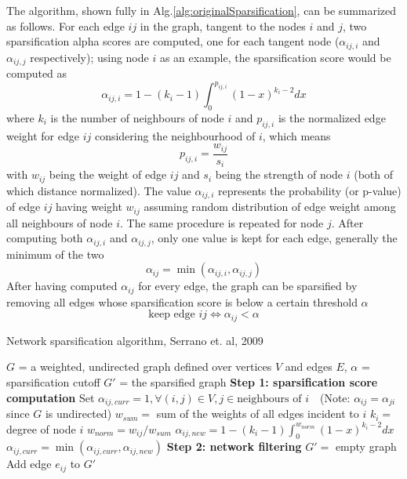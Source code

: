 The algorithm, shown fully in Alg.\ref{alg:originalSparsification}, can be summarized as follows. For each edge $ij$ in the graph, tangent to the nodes $i$ and $j$, two sparsification alpha scores are computed, one for each tangent node ($\alpha_{ij,i}$ and $\alpha_{ij,j}$ respectively); using node $i$ as an example, the sparsification score would be computed as
$$\alpha_{ij,i} = 1 - (k_i-1) \int_0^{p_{ij,i}}(1-x)^{k_i-2}dx$$
where $k_i$ is the number of neighbours of node $i$ and $p_{ij,i}$ is the normalized edge weight for edge $ij$ considering the neighbourhood of $i$, which means 
$$p_{ij,i} = \frac{w_{ij}}{s_i}$$ 
with $w_{ij}$ being the weight of edge $ij$ and $s_i$ being the strength of node $i$ (both of which distance normalized). The value $\alpha_{ij,i}$ represents the probability (or p-value) of edge $ij$ having weight $w_{ij}$ assuming random distribution of edge weight among all neighbours of node $i$.
The same procedure is repeated for node $j$.
After computing both $\alpha_{ij,i}$ and $\alpha_{ij,j}$, only one value is kept for each edge, generally the minimum of the two
$$\alpha_{ij} = \min(\alpha_{ij,i}, \alpha_{ij,j})$$
After having computed $\alpha_{ij}$ for every edge, the graph can be sparsified by removing all edges whose sparsification score is below a certain threshold $\alpha$
$$\text{keep edge } ij \iff \alpha_{ij} < \alpha$$

\begin{algorithm}[h]
\caption{Network sparsification algorithm, Serrano et. al, 2009}\label{alg:originalSparsification}
\begin{algorithmic}[1]
\Require $G$ = a weighted, undirected graph defined over vertices $V$ and edges $E$, $\alpha$ = sparsification cutoff
\Ensure $G'$ = the sparsified graph
\Statex
\State \textbf{Step 1: sparsification score computation}
\State Set $\alpha_{ij, curr} = 1, \forall (i,j) \in V, j \in \text{neighbours of } i$ \,\, (Note: $\alpha_{ij} = \alpha_{ji}$ since $G$ is undirected)
    \State $w_{sum} =$ sum of the weights of all edges incident to $i$
    \State $k_i =$ degree of node $i$ 
      \State $w_{norm} = w_{ij} / w_{sum}$
      \State $\alpha_{ij, new} = 1 - (k_i-1) \int_0^{w_{norm}}(1-x)^{k_i-2}dx$
      \State $\alpha_{ij, curr} = \min(\alpha_{ij, curr},\alpha_{ij, new})$
    \EndFor
\EndFor
\Statex
\State \textbf{Step 2: network filtering}
\State $G' =$ empty graph
        \State Add edge $e_{ij}$ to $G'$
    \EndIf
\EndFor
\end{algorithmic}
\end{algorithm}

